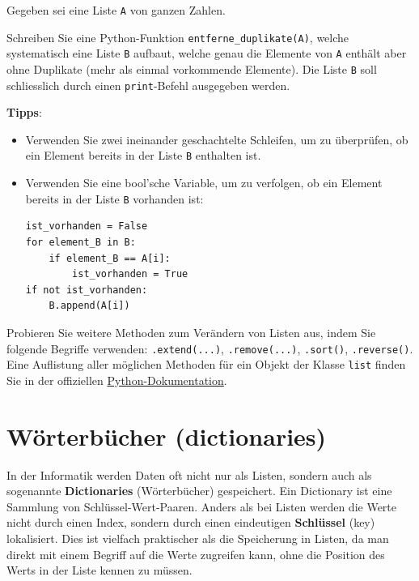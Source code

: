 \begin{myexercise}
	Gegeben sei eine Liste \texttt{A} von ganzen Zahlen.

	Schreiben Sie eine Python-Funktion \lstinline|entferne_duplikate(A)|, welche systematisch eine Liste \texttt{B} aufbaut, welche genau die Elemente von \texttt{A} enthält aber ohne Duplikate (mehr als einmal vorkommende Elemente). Die Liste \texttt{B} soll schliesslich durch einen \lstinline|print|-Befehl ausgegeben werden.

	\textbf{Tipps}: %
	\begin{itemize}
		\item Verwenden Sie zwei ineinander geschachtelte Schleifen, um zu überprüfen, ob ein Element bereits in der Liste \texttt{B} enthalten ist.
		\item Verwenden Sie eine bool'sche Variable, um zu verfolgen, ob ein Element bereits in der Liste \texttt{B} vorhanden ist:
		      \begin{lstlisting}
ist_vorhanden = False
for element_B in B:
	if element_B == A[i]:
		ist_vorhanden = True
if not ist_vorhanden:
	B.append(A[i])
		\end{lstlisting}
	\end{itemize}

	\begin{myanswer}
		
	\end{myanswer}
\end{myexercise}

\begin{mychallenge}
	Probieren Sie weitere Methoden zum Verändern von Listen aus, indem Sie folgende Begriffe verwenden: \lstinline|.extend(...)|, \lstinline|.remove(...)|, \lstinline|.sort()|, \lstinline|.reverse()|. Eine Auflistung aller möglichen Methoden für ein Objekt der Klasse \lstinline|list| finden Sie in der offiziellen \href{https://docs.python.org/3/tutorial/datastructures.html#more-on-lists}{Python-Dokumentation}.
\end{mychallenge}

\section{Wörterbücher (dictionaries)}
In der Informatik werden Daten oft nicht nur als Listen, sondern auch als sogenannte \textbf{Dictionaries} (Wörterbücher) gespeichert. Ein Dictionary ist eine Sammlung von Schlüssel-Wert-Paaren. Anders als bei Listen werden die Werte nicht durch einen Index, sondern durch einen eindeutigen \textbf{Schlüssel} (key) lokalisiert. Dies ist vielfach praktischer als die Speicherung in Listen, da man direkt mit einem Begriff auf die Werte zugreifen kann, ohne die Position des Werts in der Liste kennen zu müssen.

